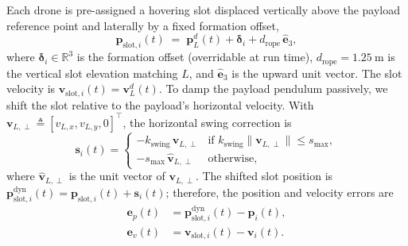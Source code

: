 \documentclass[lettersize,journal]{IEEEtran}
\newcommand{\R}{\mathbb{R}}
\newcommand{\vect}[1]{\boldsymbol{#1}}
\begin{document}
Each drone is pre-assigned a hovering slot displaced vertically above the payload reference point and laterally by a fixed formation offset,
\begin{equation}
  \vect p_{\mathrm{slot},i}(t)
    \;=\; \vect p_L^d(t) + \boldsymbol\delta_i
        + d_{\mathrm{rope}}\,\hat{\vect e}_3,
  \label{eq:slot-pos}
\end{equation}
where $\boldsymbol\delta_i \in \R^3$ is the formation offset (overridable at run time), $d_{\mathrm{rope}} = \SI{1.25}{\metre}$ is the vertical slot elevation matching $L$, and $\hat{\vect e}_3$ is the upward unit vector. The slot velocity is $\vect v_{\mathrm{slot},i}(t) = \vect v_L^d(t)$. To damp the payload pendulum passively, we shift the slot relative to the payload's horizontal velocity. With $\vect v_{L,\perp} \triangleq [v_{L,x}, v_{L,y}, 0]^{\top}$, the horizontal swing correction is
\begin{equation}
  \vect s_i(t) =
    \begin{cases}
      -k_{\mathrm{swing}}\,\vect v_{L,\perp}
        & \text{if }
          k_{\mathrm{swing}}\|\vect v_{L,\perp}\| \le s_{\max}, \\[2pt]
      -s_{\max}\,\hat{\vect v}_{L,\perp}
        & \text{otherwise,}
    \end{cases}
  \label{eq:swing-shift}
\end{equation}
where $\hat{\vect v}_{L,\perp}$ is the unit vector of $\vect v_{L,\perp}$. The shifted slot position is $\vect p_{\mathrm{slot},i}^{\mathrm{dyn}}(t) = \vect p_{\mathrm{slot},i}(t) + \vect s_i(t)$; therefore, the position and velocity errors are
\begin{align}
    \label{eq:slot-error}
  \vect e_p(t) &= \vect p_{\mathrm{slot},i}^{\mathrm{dyn}}(t)
                 - \vect p_i(t),\\
  \vect e_v(t) &= \vect v_{\mathrm{slot},i}(t) - \vect v_i(t).\nonumber
\end{align}
\end{document}
